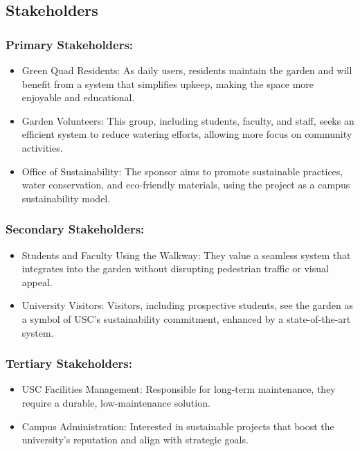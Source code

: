 \documentclass[11pt]{article}
\begin{document}
\subsection{Stakeholders}
\subsubsection{Primary Stakeholders:}
\begin{itemize}
    \item Green Quad Residents: As daily users, residents maintain the garden and will benefit from a system that simplifies upkeep, making the space more enjoyable and educational.
    \item Garden Volunteers: This group, including students, faculty, and staff, seeks an efficient system to reduce watering efforts, allowing more focus on community activities.
    \item Office of Sustainability: The sponsor aims to promote sustainable practices, water conservation, and eco-friendly materials, using the project as a campus sustainability model.
\end{itemize}

\subsubsection{Secondary Stakeholders:}
\begin{itemize}
    \item Students and Faculty Using the Walkway: They value a seamless system that integrates into the garden without disrupting pedestrian traffic or visual appeal.
    \item University Visitors: Visitors, including prospective students, see the garden as a symbol of USC’s sustainability commitment, enhanced by a state-of-the-art system.
\end{itemize}

\subsubsection{Tertiary Stakeholders:}
\begin{itemize}
    \item USC Facilities Management: Responsible for long-term maintenance, they require a durable, low-maintenance solution.
    \item Campus Administration: Interested in sustainable projects that boost the university’s reputation and align with strategic goals.
\end{itemize}
\newpage
\end{document}
